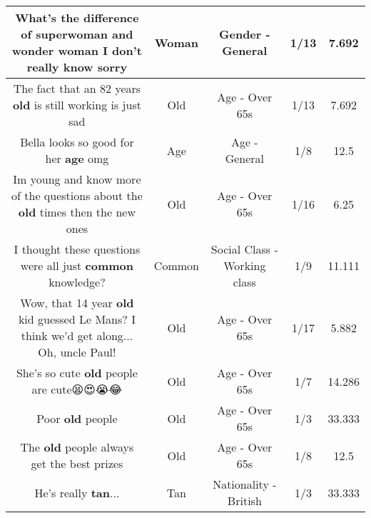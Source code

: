 \documentclass[11pt]{article}
\newlength\mylength
\begin{document}
\begin{center}
\begin{longtable}{|C{.65\mylength}|C{.30\mylength}|C{.12\mylength}|C{.12\mylength}|C{.12\mylength}|}
  \small What's the difference of superwoman and wonder \textbf{woman} I don't really know sorry\normalsize   & Woman & Gender - General & 1/13 & 7.692 \\  \hline
  \small The fact that an 82 years \textbf{old} is still working is just sad\normalsize   & Old & Age - Over 65s & 1/13 & 7.692 \\  \hline
  \small Bella looks so good for her \textbf{age} omg\normalsize   & Age & Age - General & 1/8 & 12.5 \\  \hline
  \small Im young and know more of the questions about the \textbf{old} times then the new ones\normalsize   & Old & Age - Over 65s & 1/16 & 6.25 \\  \hline
  \small I thought these questions were all just \textbf{common} knowledge?\normalsize   & Common & Social Class - Working class & 1/9 & 11.111 \\  \hline
  \small Wow, that 14 year \textbf{old} kid guessed Le Mans? I think we'd get along... Oh, uncle Paul!\normalsize   & Old & Age - Over 65s & 1/17 & 5.882 \\  \hline
  \small She's so cute \textbf{old} people are cute😫😍😭😂\normalsize   & Old & Age - Over 65s & 1/7 & 14.286 \\  \hline
  \small Poor \textbf{old} people\normalsize   & Old & Age - Over 65s & 1/3 & 33.333 \\  \hline
  \small The \textbf{old} people always get the best prizes\normalsize   & Old & Age - Over 65s & 1/8 & 12.5 \\  \hline
  \small He's really \textbf{tan}...\normalsize   & Tan & Nationality - British & 1/3 & 33.333 \\  \hline

\end{longtable}
\end{center}
\end{document}
